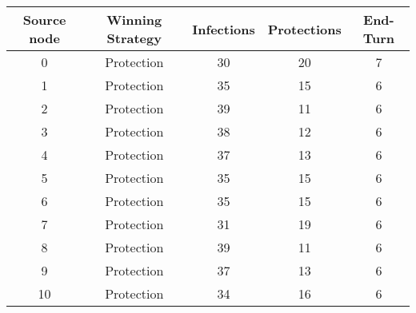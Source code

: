 \documentclass[results.tex]{subfiles}
\begin{document}
    \begin{center}
        \begin{tabular}{| c || c | c | c | c |}
            \hline
            {\bfseries Source node} & {\bfseries Winning Strategy} & {\bfseries Infections} & {\bfseries Protections}
            & {\bfseries End-Turn}
            \\  %
            \hline\hline
            0                       & Protection                   & 30                     & 20                      & 7                    \\
            \hline
            1                       & Protection                   & 35                     & 15                      & 6                    \\
            \hline
            2                       & Protection                   & 39                     & 11                      & 6                    \\
            \hline
            3                       & Protection                   & 38                     & 12                      & 6                    \\
            \hline
            4                       & Protection                   & 37                     & 13                      & 6                    \\
            \hline
            5                       & Protection                   & 35                     & 15                      & 6                    \\
            \hline
            6                       & Protection                   & 35                     & 15                      & 6                    \\
            \hline
            7                       & Protection                   & 31                     & 19                      & 6                    \\
            \hline
            8                       & Protection                   & 39                     & 11                      & 6                    \\
            \hline
            9                       & Protection                   & 37                     & 13                      & 6                    \\
            \hline
            10                      & Protection                   & 34                     & 16                      & 6                    \\

\end{tabular}
\end{center}
\end{document}
